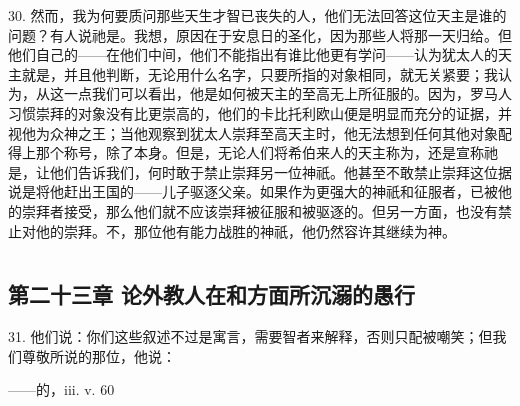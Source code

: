 30. 然而，我为何要质问那些天生才智已丧失的人，他们无法回答这位天主是谁的问题？有人说祂是。我想，原因在于安息日的圣化，因为那些人将那一天归给。但他们自己的——在他们中间，他们不能指出有谁比他更有学问——认为犹太人的天主就是，并且他判断，无论用什么名字，只要所指的对象相同，就无关紧要；我认为，从这一点我们可以看出，他是如何被天主的至高无上所征服的。因为，罗马人习惯崇拜的对象没有比更崇高的，他们的卡比托利欧山便是明显而充分的证据，并视他为众神之王；当他观察到犹太人崇拜至高天主时，他无法想到任何其他对象配得上那个称号，除了本身。但是，无论人们将希伯来人的天主称为，还是宣称祂是，让他们告诉我们，何时敢于禁止崇拜另一位神祇。他甚至不敢禁止崇拜这位据说是将他赶出王国的——儿子驱逐父亲。如果作为更强大的神祇和征服者，已被他的崇拜者接受，那么他们就不应该崇拜被征服和被驱逐的。但另一方面，也没有禁止对他的崇拜。不，那位他有能力战胜的神祇，他仍然容许其继续为神。\par



\section{}


\subsection{第二十三章 论外教人在和方面所沉溺的愚行}

31. 他们说：你们这些叙述不过是寓言，需要智者来解释，否则只配被嘲笑；但我们尊敬所说的那位，他说：\par

\newline{}——的，iii. v. 60\par

